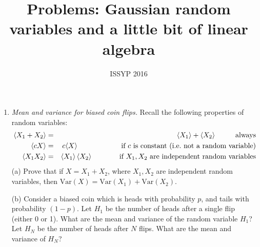 \documentclass[aps,prd,superscriptaddress,groupedaddress,nofootinbib,nobibnotes]{revtex4}
\newcommand{\ba}{\begin{eqnarray}}
\newcommand{\ea}{\end{eqnarray}}
\newcommand{\nn}{\nonumber}
\def\Var{\mbox{Var}}
\begin{document}
\title{Problems: Gaussian random variables and a little bit of linear algebra}

\author{ISSYP 2016}


\maketitle

\begin{enumerate}

\item {\em Mean and variance for biased coin flips.}
Recall the following properties of random variables:
\ba
\langle X_1 + X_2 \rangle &=& \langle X_1 \rangle + \langle X_2 \rangle \hspace{1cm} \mbox{always} \nn \\
\langle c X \rangle &=& c \langle X \rangle \hspace{2.15cm} \mbox{if $c$ is constant (i.e.~not a random variable)} \nn \\
\langle X_1 X_2 \rangle &=& \langle X_1 \rangle \, \langle X_2 \rangle \hspace{1.37cm} \mbox{if $X_1,X_2$ are independent random variables}
\ea
(a) Prove that if $X = X_1 + X_2$, where $X_1,X_2$ are independent random variables, then $\Var(X) = \Var(X_1) + \Var(X_2)$.
\par\medskip
(b) Consider a biased coin which is heads with probability $p$, and tails with probability $(1-p)$.
Let $H_1$ be the number of heads after a single flip (either 0 or 1).  What are the mean and variance of the random variable $H_1$?
Let $H_N$ be the number of heads after $N$ flips.  What are the mean and variance of $H_N$?


\end{enumerate}
\end{document}
